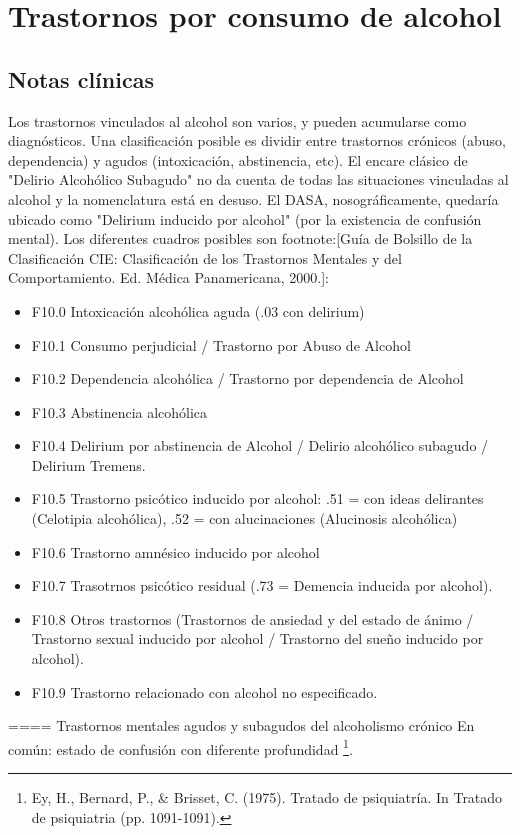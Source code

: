 \documentclass[encares.tex]{subfiles}
\begin{document}
\section*{Trastornos por consumo de alcohol}
\subsection*{Notas clínicas}
Los trastornos vinculados al alcohol son varios, y pueden acumularse como diagnósticos. Una clasificación posible es dividir entre trastornos crónicos (abuso, dependencia) y agudos (intoxicación, abstinencia, etc). El encare clásico de "Delirio Alcohólico Subagudo" no da cuenta de todas las situaciones vinculadas al alcohol y la nomenclatura está en desuso. El DASA, nosográficamente, quedaría ubicado como "Delirium inducido por alcohol" (por la existencia de confusión mental). Los diferentes cuadros posibles son footnote:[Guía de Bolsillo de la Clasificación CIE: Clasificación de los Trastornos Mentales y del Comportamiento. Ed. Médica Panamericana, 2000.]:
\begin{itemize}
\item F10.0 Intoxicación alcohólica aguda (.03 con delirium)
\item F10.1 Consumo perjudicial / Trastorno por Abuso de Alcohol
\item F10.2 Dependencia alcohólica / Trastorno por dependencia de Alcohol
\item F10.3 Abstinencia alcohólica
\item F10.4 Delirium por abstinencia de Alcohol / Delirio alcohólico subagudo / Delirium Tremens.
\item F10.5 Trastorno psicótico inducido por alcohol: .51 = con ideas delirantes (Celotipia alcohólica), .52 = con alucinaciones (Alucinosis alcohólica)
\item F10.6 Trastorno amnésico inducido por alcohol
\item F10.7 Trasotrnos psicótico residual (.73 = Demencia inducida por alcohol).
\item F10.8 Otros trastornos (Trastornos de ansiedad y del estado de ánimo / Trastorno sexual inducido por alcohol / Trastorno del sueño inducido por alcohol).
\item F10.9 Trastorno relacionado con alcohol no especificado.
\end{itemize}
==== Trastornos mentales agudos y subagudos del alcoholismo crónico
En común: estado de confusión con diferente profundidad \footnote{Ey, H., Bernard, P., \& Brisset, C. (1975). Tratado de psiquiatría. In Tratado de psiquiatria (pp. 1091-1091).}.
\end{document}
